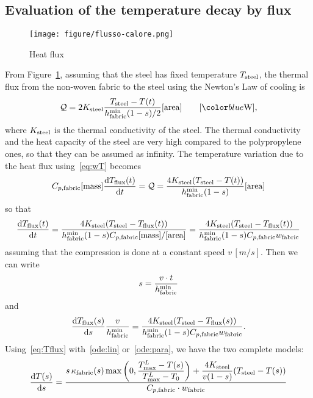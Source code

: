 \subsection{Evaluation of the temperature decay by flux}
\begin{figure}[H]
    \begin{center}
      \texttt{[image: figure/flusso-calore.png]} \\
    \end{center}
    \caption{Heat flux}%
    \label{fig:heat-flux}
\end{figure}
From Figure~\ref{fig:heat-flux}, assuming that the steel has fixed temperature $T_{\mathrm{steel}}$, the thermal flux from the non-woven fabric to the steel using the Newton's Law of cooling is
\[
   \mathcal{Q} = 2\Ksteel
   \dfrac{\Tsteel-T(t)}{\htissuemin(1-s)/2} [\textrm{area}]
   \qquad [\unit{W}],
\]
where $K_{\mathrm{steel}}$ is the thermal conductivity of the steel. The thermal conductivity and the heat capacity of the steel are very high compared to the polypropylene ones, so that they can be assumed as infinity. The temperature variation due to the heat flux using~\eqref{eq:wT} becomes
\[
  C_{p,\textrm{fabric}}[\textrm{mass}]\dfrac{\mathrm{d}T_{\mathrm{flux}}(t)}{\mathrm{d}t}
  = \mathcal{Q} = \dfrac{4K_{\mathrm{steel}}(T_{\mathrm{steel}}-T(t))}{h_{\mathrm{fabric}}^{\min}(1-s)}  [\textrm{area}]
\]
so that
\begin{equation}\label{eq:T:cool:by:steel}
  \dfrac{\mathrm{d}T_{\mathrm{flux}}(t)}{\mathrm{d}t}
  =
  \dfrac{4K_{\mathrm{steel}}(T_{\mathrm{steel}}-T_{\mathrm{flux}}(t))}{h_{\mathrm{fabric}}^{\min}(1-s)C_{p,\textrm{fabric}}[\textrm{mass}]/[\textrm{area}]}
  =
  \dfrac{4K_{\mathrm{steel}}(T_{\mathrm{steel}}-T_{\mathrm{flux}}(t))}{h_{\mathrm{fabric}}^{\min}(1-s)C_{p,\textrm{fabric}}w_{\mathrm{fabric}}}
\end{equation}
assuming that the compression is done at a constant speed $v\,[\unit{m/s}]$. Then we can write
\[
   s = \dfrac{v\cdot t}{h_{\mathrm{fabric}}^{\min}}
\]
and
\begin{equation}\label{eq:Tflux}
  \dfrac{\mathrm{d}T_{\mathrm{flux}}(s)}{\mathrm{d}s}\dfrac{v}{h_{\mathrm{fabric}}^{\min}}=
  \dfrac{4K_{\mathrm{steel}}(T_{\mathrm{steel}}-T_{\mathrm{flux}}(s))}{h_{\mathrm{fabric}}^{\min}(1-s)C_{p,\textrm{fabric}}w_{\mathrm{fabric}}}.
\end{equation}
Using~\eqref{eq:Tflux} with~\eqref{ode:lin} or~\eqref{ode:para}, we have the two complete models:
\begin{equation}\label{ode:lin:full}
   \dfrac{\mathrm{d}T(s)}{\mathrm{d}s} = \dfrac{s\,\kappa_{\mathrm{fabric}}(s)\max\left(0, \dfrac{{T_{\max}^L}-T(s)}{{T_{\max}^L}-T_0}\right)
   +\dfrac{4K_{\mathrm{steel}}}{v(1-s)}
  (T_{\mathrm{steel}}-T(s))}{C_{p,\textrm{fabric}}\cdot w_{\mathrm{fabric}}}
\end{equation}
